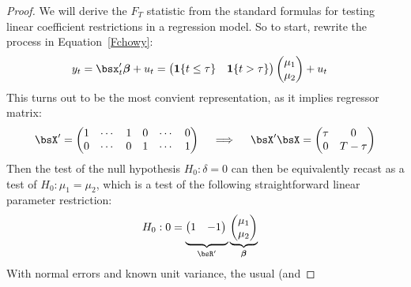 \documentclass[12pt]{article}
\theoremstyle{plain}
\theoremstyle{definition}
\theoremstyle{remark}
\newcommand{\bsbeta}{\boldsymbol{\beta}}
\begin{document}
\begin{proof}
We will derive the $F_T$ statistic from the standard formulas for
testing linear coefficient restrictions in a regression model.
So to start, rewrite the process in Equation~\ref{Fchowy}:
\begin{align*}
  y_t
  &=
  \bsx_t' \bsbeta + u_t
  =
  \begin{pmatrix}
    \mathbf{1}\{t\leq\tau\} &
    \mathbf{1}\{t>\tau\}
  \end{pmatrix}
  \begin{pmatrix}
    \mu_1 \\ \mu_2
  \end{pmatrix}
  + u_t
\end{align*}
This turns out to be the most convient representation, as it implies
regressor matrix:
\begin{align*}
  \bsX' =
  \begin{pmatrix}
    1 & \cdots & 1 & 0 & \cdots & 0 \\
    0 & \cdots & 0 & 1 & \cdots & 1 \\
  \end{pmatrix}
  \quad\implies\quad
  \bsX'\bsX =
  \begin{pmatrix}
    \tau & 0 \\
    0 & T-\tau\\
  \end{pmatrix}
\end{align*}
Then the test of the null hypothesis $H_0:\delta=0$ can then be
equivalently recast as a test of $H_0:\mu_1=\mu_2$, which is a test of
the following straightforward linear parameter restriction:
\begin{align*}
  H_0:
  0
  &=
  \underbrace{%
    \begin{pmatrix}
      1 & -1
    \end{pmatrix}
    \vphantom{%
      \begin{pmatrix}
        \mu_1 \\ \mu_2
      \end{pmatrix}
    }
  }_{\bsR'}
  \underbrace{%
    \begin{pmatrix}
      \mu_1 \\ \mu_2
    \end{pmatrix}
  }_{\bsbeta}
\end{align*}
With normal errors and known unit variance, the usual (and

\end{proof}
\end{document}
